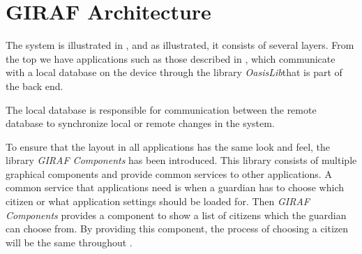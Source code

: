 \section{GIRAF Architecture}
\label{sec:giraf:architecture}
The \giraf system is illustrated in , and as illustrated, it consists of several layers. 
From the top we have applications such as those described in , which communicate with a local database on the device through the library \textit{OasisLib}that is part of the \giraf back end.

The local database is responsible for communication between the remote database to synchronize local or remote changes in the system.

To ensure that the layout in all applications has the same look and feel, the library \textit{GIRAF Components} has been introduced.
This library consists of multiple graphical components and provide common services to other \giraf applications.
A common service that applications need is when a guardian has to choose which citizen or what application settings should be loaded for.
Then \textit{GIRAF Components} provides a component to show a list of citizens which the guardian can choose from.
By providing this component, the process of choosing a citizen will be the same throughout \giraf.


